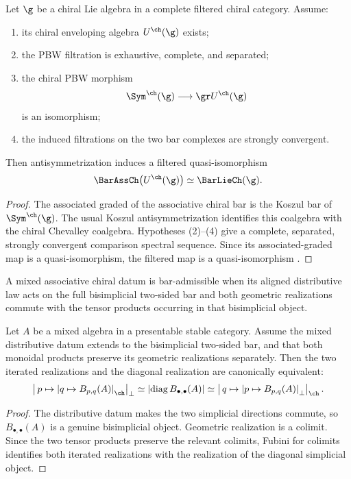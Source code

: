 \begin{theorem}
Let $\g$ be a chiral Lie algebra in a complete filtered chiral category.  Assume:
\begin{enumerate}
\item its chiral enveloping algebra $U^{\ch}(\g)$ exists;
\item the PBW filtration is exhaustive, complete, and separated;
\item the chiral PBW morphism
\[
 \Sym^{\ch}(\g)\longrightarrow \gr U^{\ch}(\g)
\]
is an isomorphism;
\item the induced filtrations on the two bar complexes are strongly convergent.
\end{enumerate}
Then antisymmetrization induces a filtered quasi-isomorphism
\[
 \BarAssCh\bigl(U^{\ch}(\g)\bigr)
 \simeq
 \BarLieCh(\g).
\]
\end{theorem}
\begin{proof}
The associated graded of the associative chiral bar is the Koszul bar of $\Sym^{\ch}(\g)$.  The usual Koszul antisymmetrization identifies this coalgebra with the chiral Chevalley coalgebra.  Hypotheses (2)--(4) give a complete, separated, strongly convergent comparison spectral sequence.  Since its associated-graded map is a quasi-isomorphism, the filtered map is a quasi-isomorphism \cite{BD04,FG12}.
\end{proof}

\begin{definition}
A mixed associative chiral datum is bar-admissible when its aligned distributive law acts on the full bisimplicial two-sided bar and both geometric realizations commute with the tensor products occurring in that bisimplicial object.
\end{definition}

\begin{theorem}
Let $A$ be a mixed algebra in a presentable stable category.  Assume the mixed distributive datum extends to the bisimplicial two-sided bar, and that both monoidal products preserve its geometric realizations separately.  Then the two iterated realizations and the diagonal realization are canonically equivalent:
\[
 \left|\,p\mapsto\left|q\mapsto B_{p,q}(A)\right|_{\ch}\right|_\perp
 \simeq
 \left|\operatorname{diag}B_{\bullet,\bullet}(A)\right|
 \simeq
 \left|\,q\mapsto\left|p\mapsto B_{p,q}(A)\right|_\perp\right|_{\ch}.
\]
\end{theorem}
\begin{proof}
The distributive datum makes the two simplicial directions commute, so $B_{\bullet,\bullet}(A)$ is a genuine bisimplicial object.  Geometric realization is a colimit.  Since the two tensor products preserve the relevant colimits, Fubini for colimits identifies both iterated realizations with the realization of the diagonal simplicial object.
\end{proof}


